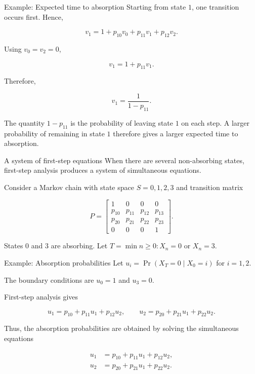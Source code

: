 \documentclass[
  ignorenonframetext,
  aspectratio=169,
]{beamer}
\begin{document}
\begin{frame}{Example: Expected time to absorption}
\protect{}\label{example-expected-time-to-absorption-1}
Starting from state \(1\), one transition occurs first. Hence,

\[
v_1=1+p_{10}v_0+p_{11}v_1+p_{12}v_2.
\]

Using \(v_0=v_2=0\),

\[
v_1=1+p_{11}v_1.
\]

Therefore,

\[
\boxed{v_1=\frac{1}{1-p_{11}}}.
\]

The quantity \(1-p_{11}\) is the probability of leaving state \(1\) on
each step. A larger probability of remaining in state \(1\) therefore
gives a larger expected time to absorption.
\end{frame}

\begin{frame}{A system of first-step equations}
\protect{}\label{a-system-of-first-step-equations}
When there are several non-absorbing states, first-step analysis
produces a system of simultaneous equations.

Consider a Markov chain with state space \(S={0,1,2,3}\) and transition
matrix

\[
P=
\begin{bmatrix}
1&0&0&0\\
p_{10}&p_{11}&p_{12}&p_{13}\\
p_{20}&p_{21}&p_{22}&p_{23}\\
0&0&0&1
\end{bmatrix}.
\]

States \(0\) and \(3\) are absorbing. Let
\(T=\min{n\geq0:X_n=0\text{ or }X_n=3}\).
\end{frame}

\begin{frame}{Example: Absorption probabilities}
\protect{}\label{example-absorption-probabilities}
Let \(u_i=\Pr(X_T=0\mid X_0=i)\) for \(i=1,2\).

The boundary conditions are \(u_0=1\) and \(u_3=0\).

First-step analysis gives

\[
u_1=p_{10}+p_{11}u_1+p_{12}u_2,
\qquad
u_2=p_{20}+p_{21}u_1+p_{22}u_2.
\]

Thus, the absorption probabilities are obtained by solving the
simultaneous equations

\[
\begin{aligned}
u_1 &=p_{10}+p_{11}u_1+p_{12}u_2,\\
u_2 &=p_{20}+p_{21}u_1+p_{22}u_2.
\end{aligned}
\]
\end{frame}
\end{document}
